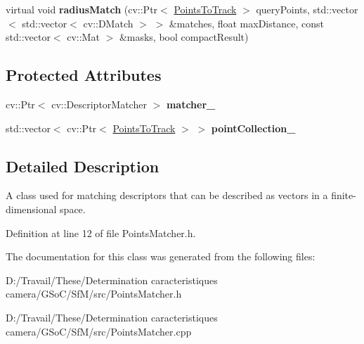 \begin{DoxyCompactItemize}
\item 
\hypertarget{class_opencv_sf_m_1_1_points_matcher_a5ad04594beba392a9939a1f8bcaaf5a2}{
virtual void {\bfseries radiusMatch} (cv::Ptr$<$ \hyperlink{class_opencv_sf_m_1_1_points_to_track}{PointsToTrack} $>$ queryPoints, std::vector$<$ std::vector$<$ cv::DMatch $>$ $>$ \&matches, float maxDistance, const std::vector$<$ cv::Mat $>$ \&masks, bool compactResult)}
\label{class_opencv_sf_m_1_1_points_matcher_a5ad04594beba392a9939a1f8bcaaf5a2}

\end{DoxyCompactItemize}
\subsection*{Protected Attributes}
\begin{DoxyCompactItemize}
\item 
\hypertarget{class_opencv_sf_m_1_1_points_matcher_a652ba26d167b0ab2dc27e8087ab8d3cf}{
cv::Ptr$<$ cv::DescriptorMatcher $>$ {\bfseries matcher\_\-}}
\label{class_opencv_sf_m_1_1_points_matcher_a652ba26d167b0ab2dc27e8087ab8d3cf}

\item 
\hypertarget{class_opencv_sf_m_1_1_points_matcher_ac6a1f04e34a72f8479814bf4eef9dfb1}{
std::vector$<$ cv::Ptr$<$ \hyperlink{class_opencv_sf_m_1_1_points_to_track}{PointsToTrack} $>$ $>$ {\bfseries pointCollection\_\-}}
\label{class_opencv_sf_m_1_1_points_matcher_ac6a1f04e34a72f8479814bf4eef9dfb1}

\end{DoxyCompactItemize}


\subsection{Detailed Description}
A class used for matching descriptors that can be described as vectors in a finite-\/dimensional space. 

Definition at line 12 of file PointsMatcher.h.



The documentation for this class was generated from the following files:\begin{DoxyCompactItemize}
\item 
D:/Travail/These/Determination caracteristiques camera/GSoC/SfM/src/PointsMatcher.h\item 
D:/Travail/These/Determination caracteristiques camera/GSoC/SfM/src/PointsMatcher.cpp\end{DoxyCompactItemize}
